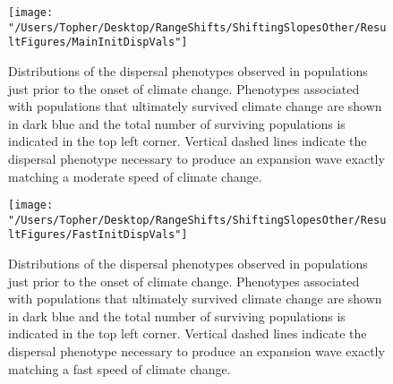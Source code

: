 \documentclass[11pt]{article}
\begin{document}
\clearpage

\begin{figure}[h!]
\texttt{[image: "/Users/Topher/Desktop/RangeShifts/ShiftingSlopesOther/ResultFigures/MainInitDispVals"]}
\caption{Distributions of the dispersal phenotypes observed in populations just prior to the onset of climate change. Phenotypes associated with populations that ultimately survived climate change are shown in dark blue and the total number of surviving populations is indicated in the top left corner. Vertical dashed lines indicate the dispersal phenotype necessary to produce an expansion wave exactly matching a moderate speed of climate change.}
\label{Fig:InitDispMain}
\end{figure}

\clearpage

\begin{figure}[h!]
\texttt{[image: "/Users/Topher/Desktop/RangeShifts/ShiftingSlopesOther/ResultFigures/FastInitDispVals"]}
\caption{Distributions of the dispersal phenotypes observed in populations just prior to the onset of climate change. Phenotypes associated with populations that ultimately survived climate change are shown in dark blue and the total number of surviving populations is indicated in the top left corner. Vertical dashed lines indicate the dispersal phenotype necessary to produce an expansion wave exactly matching a fast speed of climate change.}
\label{Fig:InitDispFast}
\end{figure}
\end{document}
